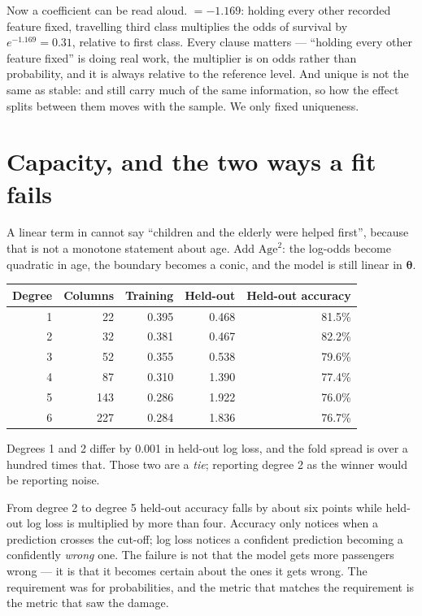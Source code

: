 \documentclass[11pt,a4paper]{article}
\begin{document}
Now a coefficient can be read aloud.  $= -1.169$: holding every
other recorded feature fixed, travelling third class multiplies the odds of
survival by $e^{-1.169} = 0.31$, relative to first class. Every clause matters
--- ``holding every other feature fixed'' is doing real work, the multiplier is
on odds rather than probability, and it is always relative to the reference
level. And unique is not the same as stable:  and  still
carry much of the same information, so how the effect splits between them moves
with the sample. We only fixed uniqueness.

\section{Capacity, and the two ways a fit fails}

A linear term in  cannot say ``children and the elderly were helped
first'', because that is not a monotone statement about age. Add
$\text{Age}^2$: the log-odds become quadratic in age, the boundary becomes a
conic, and the model is still linear in $\boldsymbol\theta$.

\begin{center}
\small
\begin{tabular}{rrrrr}
\toprule
\textbf{Degree} & \textbf{Columns} & \textbf{Training} &
\textbf{Held-out} & \textbf{Held-out accuracy} \\
\midrule
1 &  22 & 0.395 & 0.468 & 81.5\% \\
2 &  32 & 0.381 & 0.467 & 82.2\% \\
3 &  52 & 0.355 & 0.538 & 79.6\% \\
4 &  87 & 0.310 & 1.390 & 77.4\% \\
5 & 143 & 0.286 & 1.922 & 76.0\% \\
6 & 227 & 0.284 & 1.836 & 76.7\% \\
\bottomrule
\end{tabular}
\end{center}

Degrees 1 and 2 differ by 0.001 in held-out log loss, and the fold spread is
over a hundred times that. Those two are a \emph{tie}; reporting degree 2 as
the winner would be reporting noise.

From degree 2 to degree 5 held-out accuracy falls by about six points while
held-out log loss is multiplied by more than four. Accuracy only notices when a
prediction crosses the cut-off; log loss notices a confident prediction
becoming a confidently \emph{wrong} one. The failure is not that the model gets
more passengers wrong --- it is that it becomes certain about the ones it gets
wrong. The requirement was for probabilities, and the metric that matches the
requirement is the metric that saw the damage.
\end{document}
